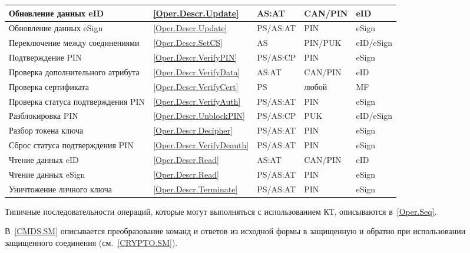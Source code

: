\begin{table}[p]
\begin{tabular}{|p{7.5cm}|p{1.3cm}|p{2.6cm}|p{1.8cm}| p{1.7cm}|}
\hline
Обновление данных eID & \ref{Oper.Descr.Update} & AS:AT & CAN/PIN & eID \\
\hline
Обновление данных eSign & \ref{Oper.Descr.Update} & PS/AS:AT & PIN & eSign \\
\hline
Переключение между соединениями & \ref{Oper.Descr.SetCS} & AS & PIN/PUK & eID/eSign \\
\hline
Подтверждение PIN & \ref{Oper.Descr.VerifyPIN} & PS/AS:CP & PIN & eSign \\
\hline
Проверка дополнительного атрибута& \ref{Oper.Descr.VerifyData}& AS:AT & CAN/PIN & eID \\
\hline
Проверка сертификата & \ref{Oper.Descr.VerifyCert} & PS & любой & MF \\
\hline
Проверка статуса подтверждения PIN & \ref{Oper.Descr.VerifyAuth} & PS/AS:AT & PIN & eSign \\
\hline
Разблокировка PIN & \ref{Oper.Descr.UnblockPIN} & PS/AS:CP  & PUK & eID/eSign \\
\hline
Разбор токена ключа & \ref{Oper.Descr.Decipher} & PS/AS:AT & PIN & eSign \\
\hline
Сброс статуса подтверждения PIN & \ref{Oper.Descr.VerifyDeauth} & PS/AS:AT  & PIN & eSign \\
\hline
Чтение данных eID & \ref{Oper.Descr.Read} & AS:AT & CAN/PIN & eID \\
\hline
Чтение данных eSign & \ref{Oper.Descr.Read} & PS/AS:AT& PIN & eSign \\
\hline
Уничтожение личного ключа & \ref{Oper.Descr.Terminate} & PS/AS:AT  & PIN & eSign \\
\hline
\end{tabular}
\end{table}

Типичные последовательности операций, которые могут выполняться 
с использованием КТ, описываются в~\ref{Oper.Seq}.

В~\ref{CMDS.SM} описывается преобразование команд и ответов из исходной формы в 
защищенную и обратно при использовании защищенного соединения (см.~\ref{CRYPTO.SM}). 


